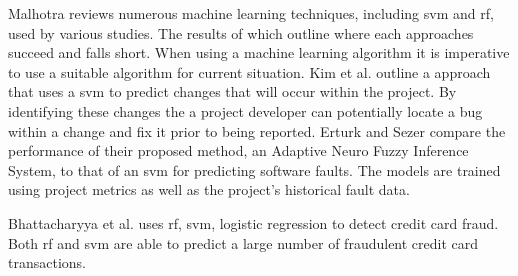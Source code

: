 Malhotra reviews numerous machine learning techniques, including \gls{svm} and \gls{rf}, used by various studies. The results of which outline where each approaches succeed and falls short. When using a machine learning algorithm it is imperative to use a suitable algorithm for current situation. Kim et al. outline a approach that uses a \gls{svm} to predict changes that will occur within the project. By identifying these changes the a project developer can potentially locate a bug within a change and fix it prior to being reported. Erturk and Sezer compare the performance of their proposed method, an Adaptive Neuro Fuzzy Inference System, to that of an \gls{svm} for predicting software faults. The models are trained using project metrics as well as the project's historical fault data.

Bhattacharyya et al. uses \gls{rf}, \gls{svm}, logistic regression to detect credit card fraud. Both \gls{rf} and \gls{svm} are able to predict a large number of fraudulent credit card transactions.


        

